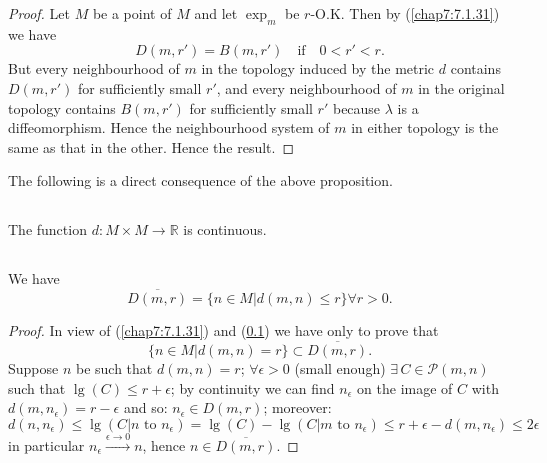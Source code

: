 \begin{proof}
Let $M$ be a point of $M$ and let $\exp_{m}$ be $r$-O.K. Then by
(\ref{chap7:7.1.31}) we have
$$
D(m,r')=B(m,r')\quad\text{if}\quad 0<r'<r.
$$
But every neighbourhood of $m$ in the topology induced by the metric
$d$ contains $D(m,r')$ for sufficiently small $r'$, and every
neighbourhood of $m$ in the original topology contains $B(m,r')$ for
sufficiently small $r'$ because $\lambda$ is a diffeomorphism. Hence
the neighbourhood system of $m$ in either topology is the same as that
in the other. Hence the result.
\end{proof}

The following is a direct consequence of the above proposition.

\setcounter{subsection}{4}

\subsection{}\label{chap7:7.2.5}

\begin{coro*}
The function $d:M\times M\to \mathbb{R}$ is continuous.
\end{coro*}

\subsection{}\label{chap7:7.2.6}

\begin{coro*}
We \pageoriginale have
$$
\overline{D(m,r)}=\{n\in M|d(m,n)\leq r\}\forall r>0.
$$
\end{coro*}

\begin{proof}
In view of (\ref{chap7:7.1.31}) and (\ref{chap7:7.2.5}) we have only to
prove that
$$
\{n\in M|d(m,n)=r\}\subset \overline{D(m,r)}.
$$
Suppose $n$ be such that $d(m,n)=r$; $\forall \epsilon>0$ (small
enough) $\exists\, C\in\mathscr{P}(m,n)$ such that $\lg(C)\leq
r+\epsilon$; by continuity we can find $n_{\epsilon}$ on the image of
$C$ with $d(m,n_{\epsilon})=r-\epsilon$ and so: $n_{\epsilon}\in
D(m,r)$; moreover:
$$
d(n,n_{\epsilon})\leq \lg(C|n\text{ to }
n_{\epsilon})=\lg(C)-\lg(C|m\text{ to } n_{\epsilon})\leq
r+\epsilon-d(m,n_{\epsilon})\leq 2\epsilon
$$
in particular $n_{\epsilon}\xrightarrow{\epsilon\to 0}n$, hence
$n\in\overline{D(m,r)}$. 
\end{proof}

\subsection{}\label{chap7:7.2.7}

